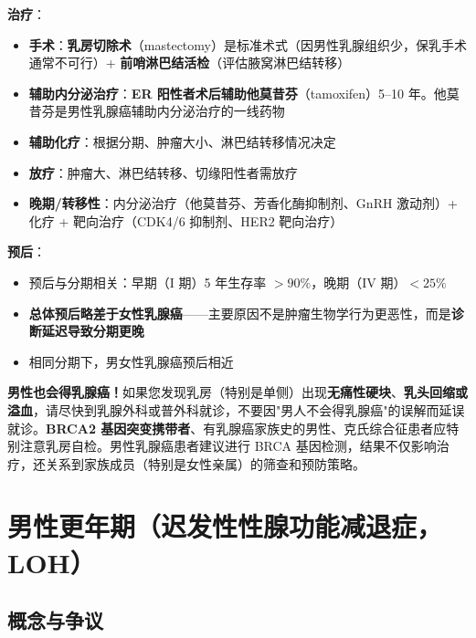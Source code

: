 \vspace{0.5em}
\noindent\textbf{治疗}：

\begin{itemize}[leftmargin=2cm]
	\item \textbf{手术}：\textbf{乳房切除术}（mastectomy）是标准术式（因男性乳腺组织少，保乳手术通常不可行）+ \textbf{前哨淋巴结活检}（评估腋窝淋巴结转移）
	\item \textbf{辅助内分泌治疗}：\textbf{ER 阳性者术后辅助他莫昔芬}（tamoxifen）5--10 年。他莫昔芬是男性乳腺癌辅助内分泌治疗的一线药物
	\item \textbf{辅助化疗}：根据分期、肿瘤大小、淋巴结转移情况决定
	\item \textbf{放疗}：肿瘤大、淋巴结转移、切缘阳性者需放疗
	\item \textbf{晚期/转移性}：内分泌治疗（他莫昔芬、芳香化酶抑制剂、GnRH 激动剂）+ 化疗 + 靶向治疗（CDK4/6 抑制剂、HER2 靶向治疗）
\end{itemize}

\vspace{0.5em}
\noindent\textbf{预后}：

\begin{itemize}[leftmargin=2cm]
	\item 预后与分期相关：早期（I 期）5 年生存率 $>90\%$，晚期（IV 期）$<25\%$
	\item \textbf{总体预后略差于女性乳腺癌}——主要原因不是肿瘤生物学行为更恶性，而是\textbf{诊断延迟导致分期更晚}
	\item 相同分期下，男女性乳腺癌预后相近
\end{itemize}

\begin{tcolorbox}[colback=pink!5!white,colframe=red!50!black,title=贴心小叮咛]
\textbf{男性也会得乳腺癌！}如果您发现乳房（特别是单侧）出现\textbf{无痛性硬块}、\textbf{乳头回缩或溢血}，请尽快到乳腺外科或普外科就诊，不要因"男人不会得乳腺癌"的误解而延误就诊。\textbf{BRCA2 基因突变携带者}、有乳腺癌家族史的男性、克氏综合征患者应特别注意乳房自检。男性乳腺癌患者建议进行 BRCA 基因检测，结果不仅影响治疗，还关系到家族成员（特别是女性亲属）的筛查和预防策略。
\end{tcolorbox}

\section{男性更年期（迟发性性腺功能减退症，LOH）}
\label{sec:male_menopause}

\subsection{概念与争议}

